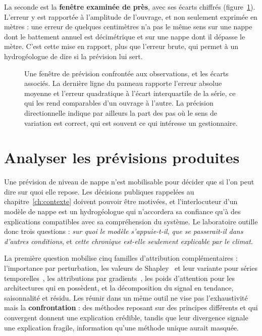 La seconde est la \textbf{fenêtre examinée de près}, avec ses écarts chiffrés
(figure~\ref{fig:prevision}). L'erreur y est rapportée à l'amplitude de l'ouvrage, et non
seulement exprimée en mètres : une erreur de quelques centimètres n'a pas le même sens sur une
nappe dont le battement annuel est décimétrique et sur une nappe dont il dépasse le mètre. C'est
cette mise en rapport, plus que l'erreur brute, qui permet à un hydrogéologue de dire si la
prévision lui sert.

\begin{figure}[htbp]
\centering
{}\hfill{}
\caption{Une fenêtre de prévision confrontée aux observations, et les écarts associés. La
dernière ligne du panneau rapporte l'erreur absolue moyenne et l'erreur quadratique à l'écart
interquartile de la série, ce qui les rend comparables d'un ouvrage à l'autre. La précision
directionnelle indique par ailleurs la part des pas où le sens de variation est correct, qui est
souvent ce qui intéresse un gestionnaire. \lecas}
\label{fig:prevision}
\end{figure}

\section{Analyser les prévisions produites}
\label{sec:xai}

Une prévision de niveau de nappe n'est mobilisable pour décider que si l'on peut dire sur quoi
elle repose. Les décisions publiques rappelées au chapitre~\ref{ch:contexte} doivent pouvoir être
motivées, et l'interlocuteur d'un modèle de nappe est un hydrogéologue qui n'accordera sa
confiance qu'à des explications compatibles avec sa compréhension du système. Le laboratoire
outille donc trois questions : \emph{sur quoi le modèle s'appuie-t-il}, \emph{que se
passerait-il dans d'autres conditions}, et \emph{cette chronique est-elle seulement explicable
par le climat}.

La première question mobilise cinq familles d'attribution complémentaires :
l'importance par perturbation, les valeurs de Shapley~\cite{lundberg2017shap} et leur variante
pour séries temporelles~\cite{bento2021timeshap}, les attributions par
gradients~\cite{sundararajan2017ig,captum}, les poids d'attention pour les architectures qui en
possèdent, et la décomposition du signal en tendance, saisonnalité et résidu. Les réunir dans un
même outil ne vise pas l'exhaustivité mais la \textbf{confrontation} : des méthodes reposant sur
des principes différents et qui convergent donnent une explication crédible, tandis que leur
divergence signale une explication fragile, information qu'une méthode unique aurait masquée.

